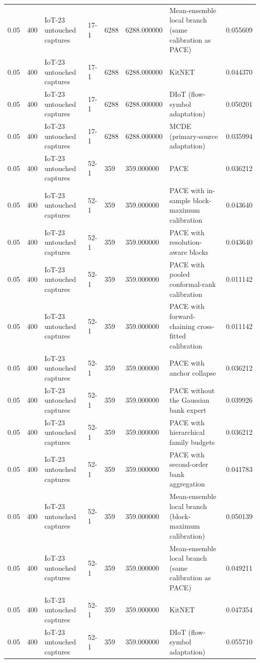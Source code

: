 \begin{tabular}{llllllll}
0.05 & 400 & IoT-23 untouched captures & 17-1 & 6288 & 6288.000000 & Mean-ensemble local branch (same calibration as PACE) & 0.055609 \\
0.05 & 400 & IoT-23 untouched captures & 17-1 & 6288 & 6288.000000 & KitNET & 0.044370 \\
0.05 & 400 & IoT-23 untouched captures & 17-1 & 6288 & 6288.000000 & DIoT (flow-symbol adaptation) & 0.050201 \\
0.05 & 400 & IoT-23 untouched captures & 17-1 & 6288 & 6288.000000 & MCDE (primary-source adaptation) & 0.035994 \\
0.05 & 400 & IoT-23 untouched captures & 52-1 & 359 & 359.000000 & PACE & 0.036212 \\
0.05 & 400 & IoT-23 untouched captures & 52-1 & 359 & 359.000000 & PACE with in-sample block-maximum calibration & 0.043640 \\
0.05 & 400 & IoT-23 untouched captures & 52-1 & 359 & 359.000000 & PACE with resolution-aware blocks & 0.043640 \\
0.05 & 400 & IoT-23 untouched captures & 52-1 & 359 & 359.000000 & PACE with pooled conformal-rank calibration & 0.011142 \\
0.05 & 400 & IoT-23 untouched captures & 52-1 & 359 & 359.000000 & PACE with forward-chaining cross-fitted calibration & 0.011142 \\
0.05 & 400 & IoT-23 untouched captures & 52-1 & 359 & 359.000000 & PACE with anchor collapse & 0.036212 \\
0.05 & 400 & IoT-23 untouched captures & 52-1 & 359 & 359.000000 & PACE without the Gaussian bank expert & 0.039926 \\
0.05 & 400 & IoT-23 untouched captures & 52-1 & 359 & 359.000000 & PACE with hierarchical family budgets & 0.036212 \\
0.05 & 400 & IoT-23 untouched captures & 52-1 & 359 & 359.000000 & PACE with second-order bank aggregation & 0.041783 \\
0.05 & 400 & IoT-23 untouched captures & 52-1 & 359 & 359.000000 & Mean-ensemble local branch (block-maximum calibration) & 0.050139 \\
0.05 & 400 & IoT-23 untouched captures & 52-1 & 359 & 359.000000 & Mean-ensemble local branch (same calibration as PACE) & 0.049211 \\
0.05 & 400 & IoT-23 untouched captures & 52-1 & 359 & 359.000000 & KitNET & 0.047354 \\
0.05 & 400 & IoT-23 untouched captures & 52-1 & 359 & 359.000000 & DIoT (flow-symbol adaptation) & 0.055710 \\

\end{tabular}
